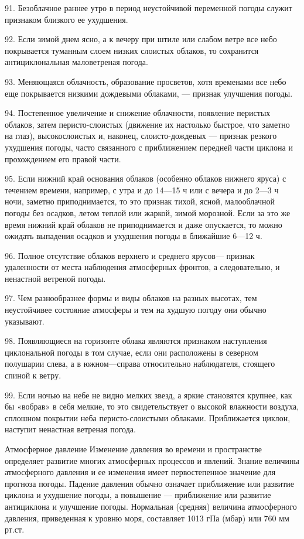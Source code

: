 91. Безоблачное раннее утро в период неустойчивой переменной погоды служит признаком близкого ее ухудшения.

92. Если зимой днем ясно, а к вечеру при штиле или слабом ветре все небо покрывается туманным слоем низких слоистых облаков, то сохранится антициклональная маловетреная погода.

93. Меняющаяся облачность, образование просветов, хотя временами все небо еще покрывается низкими дождевыми облаками, — признак улучшения погоды.

94. Постепенное увеличение и снижение облачности, появление перистых облаков, затем перисто-слоистых (движение их настолько быстрое, что заметно на глаз), высокослоистых и, наконец, слоисто-дождевых — признак резкого ухудшения погоды, часто связанного с приближением передней части циклона и прохождением его правой части.

95. Если нижний край основания облаков (особенно облаков нижнего яруса) с течением времени, например, с утра и до 14—15 ч или с вечера и до 2—3 ч ночи, заметно приподнимается, то это признак тихой, ясной, малооблачной погоды без осадков, летом теплой или жаркой, зимой морозной. Если за это же время нижний край облаков не приподнимается и даже опускается, то можно ожидать выпадения осадков и ухудшения погоды в ближайшие 6—12 ч.

96. Полное отсутствие облаков верхнего и среднего ярусов— признак удаленности от места наблюдения атмосферных фронтов, а следовательно, и ненастной ветреной погоды.

97. Чем разнообразнее формы и виды облаков на разных высотах, тем неустойчивее состояние атмосферы и тем на худшую погоду они обычно указывают.

98. Появляющиеся на горизонте облака являются признаком наступления циклональной погоды в том случае, если они расположены в северном полушарии слева, а в южном—справа относительно наблюдателя, стоящего спиной к ветру.

99. Если ночью на небе не видно мелких звезд, а яркие становятся крупнее, как бы «вобрав» в себя мелкие, то это свидетельствует о высокой влажности воздуха, сплошном покрытии неба перисто-слоистыми облаками. Приближается циклон, наступит ненастная ветреная погода.

Атмосферное давление
Изменение давления во времени и пространстве определяет развитие многих атмосферных процессов и явлений. Знание величины атмосферного давления и ее изменения имеет первостепенное значение для прогноза погоды. Падение давления обычно означает приближение или развитие циклона и ухудшение погоды, а повышение — приближение или развитие антициклона и улучшение погоды. Нормальная (средняя) величина атмосферного давления, приведенная к уровню моря, составляет 1013 гПа (мбар) или 760 мм рт.ст.

